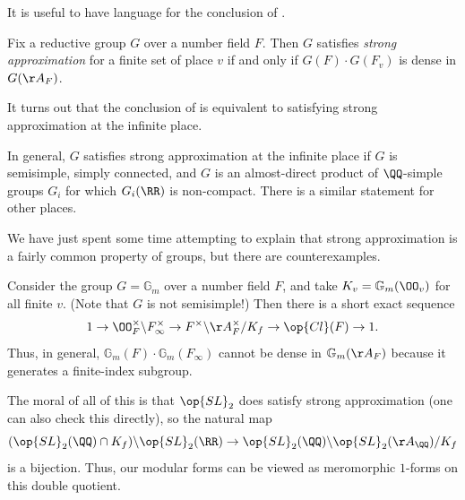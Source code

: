 \documentclass[../notes.tex]{subfiles}
\begin{document}
It is useful to have language for the conclusion of .
\begin{definition}
	Fix a reductive group $G$ over a number field $F$. Then $G$ satisfies \textit{strong approximation} for a finite set of place $v$ if and only if $G(F)\cdot G(F_v)$ is dense in $G(\AA_F)$.
\end{definition}
\begin{remark}
	It turns out that the conclusion of  is equivalent to satisfying strong approximation at the infinite place.
\end{remark}
\begin{remark}
	In general, $G$ satisfies strong approximation at the infinite place if $G$ is semisimple, simply connected, and $G$ is an almost-direct product of $\QQ$-simple groups $G_i$ for which $G_i(\RR)$ is non-compact. There is a similar statement for other places.
\end{remark}
We have just spent some time attempting to explain that strong approximation is a fairly common property of groups, but there are counterexamples.
\begin{example}
	Consider the group $G=\mathbb G_m$ over a number field $F$, and take $K_v=\mathbb G_m(\OO_v)$ for all finite $v$. (Note that $G$ is not semisimple!) Then there is a short exact sequence
	\[1\to\OO_F^\times\backslash F_\infty^\times\to F^\times\backslash\AA_F^\times/K_f\to\op{Cl}(F)\to1.\]
	Thus, in general, $\mathbb G_m(F)\cdot \mathbb G_m(F_\infty)$ cannot be dense in $\mathbb G_m(\AA_F)$ because it generates a finite-index subgroup.
\end{example}
The moral of all of this is that $\op{SL}_2$ does satisfy strong approximation (one can also check this directly), so the natural map
\[(\op{SL}_2(\QQ)\cap K_f)\backslash\op{SL}_2(\RR)\to\op{SL}_2(\QQ)\backslash\op{SL}_2(\AA_\QQ)/K_f\]
is a bijection. Thus, our modular forms can be viewed as meromorphic $1$-forms on this double quotient.
\end{document}
